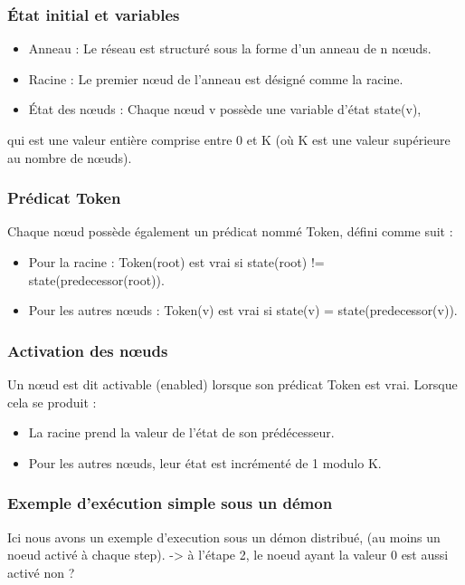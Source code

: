 \documentclass[11pt]{article}
\begin{document}
\subsubsection{État initial et variables}
\label{sec:orge0554d3}
\begin{itemize}
\item Anneau : Le réseau est structuré sous la forme d'un anneau de n nœuds.
\item Racine : Le premier nœud de l'anneau est désigné comme la racine.
\item État des nœuds : Chaque nœud v possède une variable d'état state(v),
\end{itemize}
qui est une valeur entière comprise entre 0 et K (où K est une valeur supérieure au nombre de nœuds).

\subsubsection{Prédicat Token}
\label{sec:orgf81d592}
Chaque nœud possède également un prédicat nommé Token, défini comme suit :
\begin{itemize}
\item Pour la racine : Token(root) est vrai si state(root) != state(predecessor(root)).
\item Pour les autres nœuds : Token(v) est vrai si state(v) = state(predecessor(v)).
\end{itemize}

\subsubsection{Activation des nœuds}
\label{sec:org79e1a5d}
Un nœud est dit activable (enabled) lorsque son prédicat Token est vrai. Lorsque cela se produit :
\begin{itemize}
\item La racine prend la valeur de l'état de son prédécesseur.
\item Pour les autres nœuds, leur état est incrémenté de 1 modulo K.
\end{itemize}

\subsubsection{Exemple d'exécution simple sous un démon}
\label{sec:org79476cc}

Ici nous avons un exemple d'execution sous un démon distribué, (au moins un noeud activé à chaque step). 
-> à l'étape 2, le noeud ayant la valeur 0 est aussi activé non ? 
\end{document}
